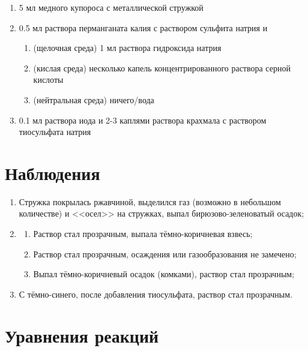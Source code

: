 \documentclass[a4paper]{article}
\begin{document}
\begin{enumerate}
    \item 5 мл медного купороса с металлической стружкой
    \item 0.5 мл раствора перманганата калия с раствором сульфита натрия и
    \begin{enumerate}
        \item (щелочная среда) 1 мл раствора гидроксида натрия
        \item (кислая среда) несколько капель концентрированного раствора серной кислоты
        \item (нейтральная среда) ничего/вода
    \end{enumerate}
    \item 0.1 мл раствора иода и 2-3 каплями раствора крахмала с раствором тиосульфата натрия 
\end{enumerate}


\section*{\centering Наблюдения}

\begin{enumerate}
    \item Стружка покрылась ржавчиной,
    выделился газ (возможно в небольшом количестве) и <<осел>> на стружках,
    выпал бирюзово-зеленоватый осадок;
    \item
    \begin{enumerate}
        \item Раствор стал прозрачным, выпала тёмно-коричневая взвесь;
        \item Раствор стал прозрачным, осаждения или газообразования не замечено;
        \item Выпал тёмно-коричневый осадок (комками), раствор стал прозрачным;
    \end{enumerate}
    \item С тёмно-синего, после добавления тиосульфата, раствор стал прозрачным.
\end{enumerate}

\section*{\centering Уравнения реакций}
\end{document}
